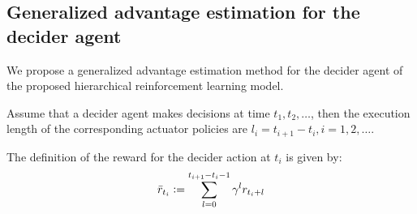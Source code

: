\subsection{Generalized advantage estimation for the decider agent}
We propose a generalized advantage estimation method for the decider agent of the proposed hierarchical reinforcement learning model. 

Assume that a decider agent makes decisions at time $t_1,t_2,\dots$, then the execution length of the corresponding actuator policies are $l_i = t_{i+1} - t_i, i=1,2,\dots$.

The definition of the reward for the decider action at $t_i$ is given by:
\begin{align}
\bar{r}_{t_i} \vcentcolon=
 \sum_{l=0}^{t_{i+1}-t_i-1}
  \gamma^l r_{t_i+l}
\end{align}

